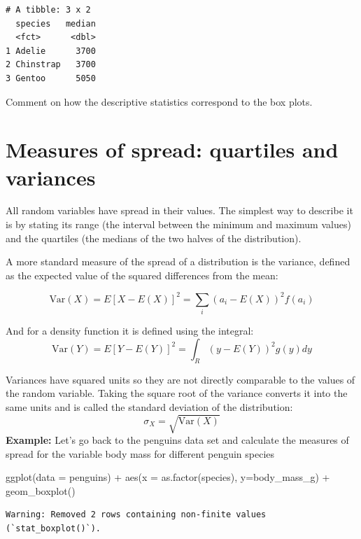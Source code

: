 \documentclass[
  letterpaper,
  DIV=11,
  numbers=noendperiod]{scrreprt}
\newenvironment{Shaded}{\begin{snugshade}}{\end{snugshade}}
\newcommand{\AttributeTok}[1]{\textcolor[rgb]{0.40,0.45,0.13}{#1}}
\newcommand{\FunctionTok}[1]{\textcolor[rgb]{0.28,0.35,0.67}{#1}}
\newcommand{\NormalTok}[1]{\textcolor[rgb]{0.00,0.23,0.31}{#1}}
\newcommand{\SpecialCharTok}[1]{\textcolor[rgb]{0.37,0.37,0.37}{#1}}
\begin{document}
\begin{verbatim}
# A tibble: 3 x 2
  species   median
  <fct>      <dbl>
1 Adelie      3700
2 Chinstrap   3700
3 Gentoo      5050
\end{verbatim}

Comment on how the descriptive statistics correspond to the box plots.

\hypertarget{measures-of-spread-quartiles-and-variances}{%
\section{Measures of spread: quartiles and
variances}\label{measures-of-spread-quartiles-and-variances}}

All random variables have spread in their values. The simplest way to
describe it is by stating its range (the interval between the minimum
and maximum values) and the quartiles (the medians of the two halves of
the distribution).

A more standard measure of the spread of a distribution is the variance,
defined as the expected value of the squared differences from the mean:

\[\text{Var}(X) = E [X - E(X)]^2 = \sum_i (a_i- E(X))^2 f(a_i)\]

And for a density function it is defined using the integral:
\[\text{Var}(Y) =  E[ Y - E(Y)]^2 = \int_R (y-E(Y))^2 g(y) dy \]

Variances have squared units so they are not directly comparable to the
values of the random variable. Taking the square root of the variance
converts it into the same units and is called the standard deviation of
the distribution: \[ \sigma_X = \sqrt{\text{Var}(X)}\] \textbf{Example:}
Let's go back to the penguins data set and calculate the measures of
spread for the variable body mass for different penguin species

\begin{Shaded}
\begin{Highlighting}[]
\FunctionTok{ggplot}\NormalTok{(}\AttributeTok{data =}\NormalTok{ penguins) }\SpecialCharTok{+} \FunctionTok{aes}\NormalTok{(}\AttributeTok{x =} \FunctionTok{as.factor}\NormalTok{(species), }\AttributeTok{y=}\NormalTok{body\_mass\_g) }\SpecialCharTok{+} \FunctionTok{geom\_boxplot}\NormalTok{()}
\end{Highlighting}
\end{Shaded}

\begin{verbatim}
Warning: Removed 2 rows containing non-finite values (`stat_boxplot()`).
\end{verbatim}
\end{document}
